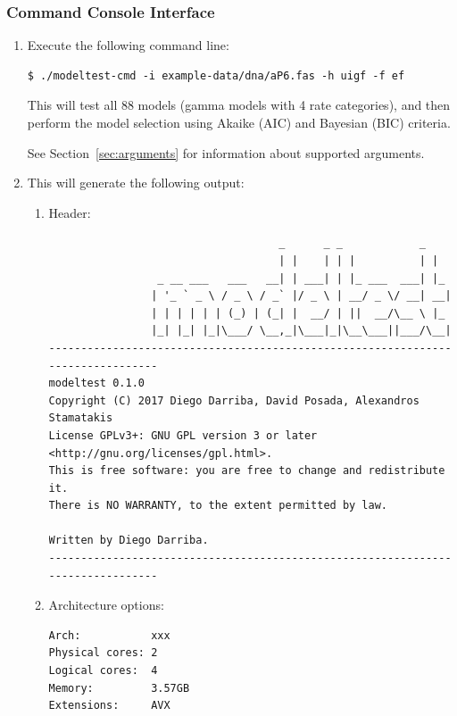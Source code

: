 \subsubsection{Command Console Interface}

\begin{enumerate}
\item Execute the following command line:

\begin{lstlisting}
$ ./modeltest-cmd -i example-data/dna/aP6.fas -h uigf -f ef
\end{lstlisting}

This will test all 88 models (gamma models with 4 rate categories), and then perform the model selection using Akaike (AIC) and Bayesian (BIC) criteria.

See Section~\ref{sec:arguments} for information about supported arguments.

\item This will generate the following output:

\begin{enumerate}

\item Header:

\begin{lstlisting}
                                    _      _ _            _   
                                    | |    | | |          | |  
                 _ __ ___   ___   __| | ___| | |_ ___  ___| |_ 
                | '_ ` _ \ / _ \ / _` |/ _ \ | __/ _ \/ __| __|
                | | | | | | (_) | (_| |  __/ | ||  __/\__ \ |_ 
                |_| |_| |_|\___/ \__,_|\___|_|\__\___||___/\__|
--------------------------------------------------------------------------------
modeltest 0.1.0
Copyright (C) 2017 Diego Darriba, David Posada, Alexandros Stamatakis
License GPLv3+: GNU GPL version 3 or later <http://gnu.org/licenses/gpl.html>.
This is free software: you are free to change and redistribute it.
There is NO WARRANTY, to the extent permitted by law.

Written by Diego Darriba.
--------------------------------------------------------------------------------
\end{lstlisting}

\item Architecture options:

\begin{lstlisting}
Arch:           xxx
Physical cores: 2
Logical cores:  4
Memory:         3.57GB
Extensions:     AVX


\end{lstlisting}
\end{enumerate}
\end{enumerate}
